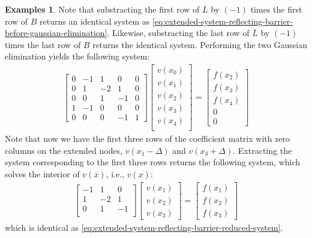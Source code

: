 \documentclass[11pt]{article}
\theoremstyle{definition}
\newtheorem{example}{Examples}[section]
\begin{document}
\begin{example}
	 Note that substracting the first row of $\overline{L}$ by $(-1)$ times the first row of $B$ returns an identical system as \eqref{eq:extended-system-reflecting-barrier-before-gaussian-elimination}. Likewise, substracting the last row of $\overline{L}$ by $(-1)$ times the last row of $B$ returns the identical system. Performing the two Gaussian elimination yields the following system:
	 \begin{align}\label{eq:extended-system-reflecting-barrier-after-gaussian-elimination}
	 \begin{bmatrix}
	 0 & -1 & 1 & 0 & 0 \\
     0 & 1 & -2 & 1 & 0 \\
     0 & 0 & 1 & -1 & 0 \\
	 1 & -1  & 0 & 0 & 0 \\
	 0 & 0 & 0 & -1 & 1
	 \end{bmatrix} 	  \begin{bmatrix}
	 v(x_0) \\
	 v(x_1) \\
	 v(x_2) \\
	 v(x_3) \\
	 v(x_4)  \\
	 \end{bmatrix}
	 = 
	 \begin{bmatrix}
	 f(x_2) \\
	 f(x_3) \\
	 f(x_4) \\
	 0 \\
	 0 
	 \end{bmatrix} 
	 \end{align}
	 Note that now we have the first three rows of the coefficient matrix with zero columns on the extended nodes, $v(x_1 - \Delta)$ and $v(x_3 + \Delta)$. Extracting the system corresponding to the first three rows returns the following system, which solves the interior of $v(\overline{x})$, i.e., $v(x)$:
	 \begin{align}
	 	 \begin{bmatrix}
	 -1 & 1 & 0  \\
	 1 & -2 & 1 \\
	 0 & 1 & -1 \\
	 \end{bmatrix} 	  \begin{bmatrix}
	 v(x_1) \\
	 v(x_2) \\
	 v(x_3) 
	 \end{bmatrix}
	 = 
	 \begin{bmatrix}
	 f(x_1) \\
	 f(x_2) \\
	 f(x_3) 
	 \end{bmatrix} 
	 \end{align}
	 which is identical as  \eqref{eq:extended-system-reflecting-barrier-reduced-system}.
\end{example}
\end{document}

